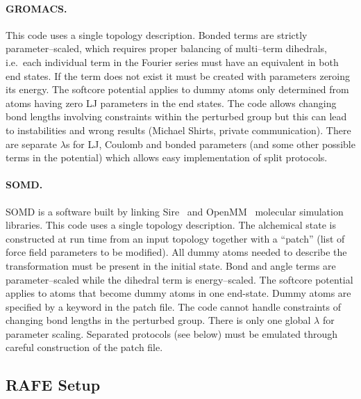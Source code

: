 \documentclass[journal=jctcce,manuscript=article]{achemso}
\begin{document}
\paragraph{GROMACS.} This code uses a single topology description.
Bonded terms are strictly parameter--scaled, which requires proper
balancing of multi--term dihedrals, i.e.\ each individual term in the Fourier 
series must have an equivalent in both end states.  If the term does not exist 
it must be created with parameters zeroing its energy.
The softcore potential applies to dummy 
atoms only determined from atoms having zero LJ parameters in the end states.
The code allows changing bond lengths involving constraints within the perturbed group  but this can lead to instabilities and wrong results (Michael Shirts, private communication).  There are separate $\lambda$s for LJ,
Coulomb and bonded parameters (and some other possible terms in the potential) which allows easy implementation 
of split protocols.

\paragraph{SOMD.} SOMD is a software built by linking  Sire~\cite{Sire-2016}
and OpenMM~\cite{doi:10.1021/ct300857j} molecular simulation libraries. 
This code uses a single topology description.
The alchemical state is constructed at run time from an input topology together with
a ``patch'' (list of force field parameters to be modified). All dummy atoms
needed to describe the transformation must be present in the initial state. 
Bond and angle terms are parameter--scaled while the dihedral term is
energy--scaled.  The softcore potential applies to atoms that become dummy atoms
 in one end-state. Dummy atoms are specified by a keyword in the patch file.
The code cannot handle constraints of changing bond lengths in the
perturbed group.  There is only one global $\lambda$ for parameter
scaling.  Separated protocols (see below) must be emulated through
careful construction of the patch file. 


\subsection{RAFE Setup}
\label{sec:rafe_setup}
\end{document}
